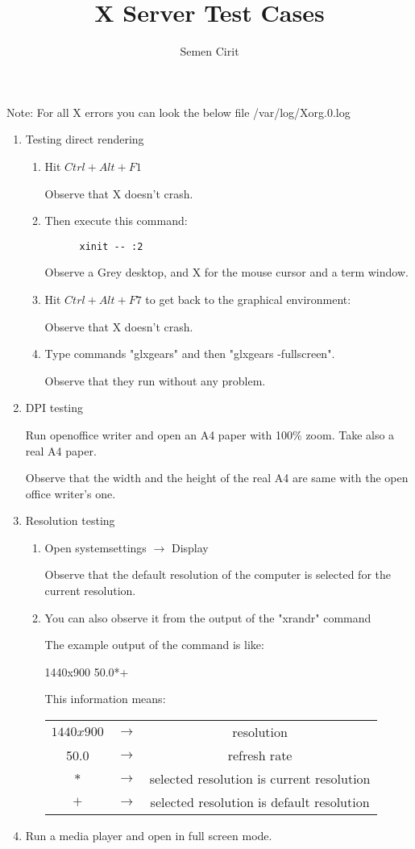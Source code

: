 \documentclass[a4paper,10pt]{article}
\title{X Server Test Cases}
\author{Semen Cirit}
\begin{document}
\maketitle

 Note:	
  	For all X errors you can look the below file
	/var/log/Xorg.0.log  
\begin{enumerate}
  \item Testing direct rendering
    \begin{enumerate}
    \item  Hit $Ctrl+Alt+F1$

	    Observe that X doesn't crash.
    \item  Then execute this command:
	  \begin{verbatim}
	  xinit -- :2
	  \end{verbatim}
	  Observe a Grey desktop, and X for the mouse cursor and a term window.
    \item Hit $Ctrl+Alt+F7$ to get back to the graphical environment:
    
	  Observe that X doesn't crash.
    \item Type commands "glxgears" and then "glxgears -fullscreen".

	  Observe that they run without any problem.
    \end{enumerate}

  \item DPI testing
    
        Run openoffice writer and open an A4 paper with 100\% zoom. Take also a real A4 paper.

        Observe that the width and the height of the real A4 are same with the open office writer's one.
  \item Resolution testing
     \begin{enumerate}
      \item Open systemsettings $\rightarrow$ Display

	Observe that the default resolution of the computer is selected for the current resolution.
      \item You can also observe it from the output of the "xrandr" command
	  
	  The example output of the command is like:
	  
	  1440x900  50.0*+
	  
	  This information means:
	  \begin{table}[h]
	  \centering
	  \begin{tabular}{|c|c|c|}
		  \hline
		  $1440x900$ & $\rightarrow$ & resolution \\
		  50.0       & $\rightarrow$ & refresh rate \\
		  $*$        & $\rightarrow$ & selected resolution is current resolution \\
		  $+$        & $\rightarrow$ & selected resolution is default resolution \\
		  \hline
	  \end{tabular} 
	  \label{tab:tbl}
	  \end{table}
    \end{enumerate}
 \item  Run a media player and open in full screen mode.


\end{enumerate}
\end{document}

